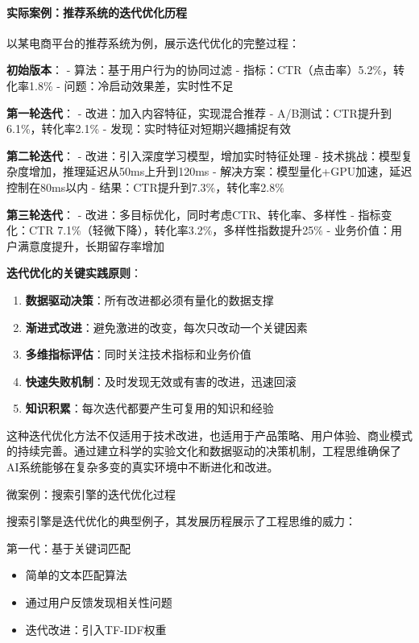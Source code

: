 \paragraph{实际案例：推荐系统的迭代优化历程}
以某电商平台的推荐系统为例，展示迭代优化的完整过程：

\textbf{初始版本}：
- 算法：基于用户行为的协同过滤
- 指标：CTR（点击率）5.2\%，转化率1.8\%
- 问题：冷启动效果差，实时性不足

\textbf{第一轮迭代}：
- 改进：加入内容特征，实现混合推荐
- A/B测试：CTR提升到6.1\%，转化率2.1\%
- 发现：实时特征对短期兴趣捕捉有效

\textbf{第二轮迭代}：
- 改进：引入深度学习模型，增加实时特征处理
- 技术挑战：模型复杂度增加，推理延迟从50ms上升到120ms
- 解决方案：模型量化+GPU加速，延迟控制在80ms以内
- 结果：CTR提升到7.3\%，转化率2.8\%

\textbf{第三轮迭代}：
- 改进：多目标优化，同时考虑CTR、转化率、多样性
- 指标变化：CTR 7.1\%（轻微下降），转化率3.2\%，多样性指数提升25\%
- 业务价值：用户满意度提升，长期留存率增加

\textbf{迭代优化的关键实践原则}：
\begin{enumerate}
\item \textbf{数据驱动决策}：所有改进都必须有量化的数据支撑
\item \textbf{渐进式改进}：避免激进的改变，每次只改动一个关键因素
\item \textbf{多维指标评估}：同时关注技术指标和业务价值
\item \textbf{快速失败机制}：及时发现无效或有害的改进，迅速回滚
\item \textbf{知识积累}：每次迭代都要产生可复用的知识和经验
\end{enumerate}

这种迭代优化方法不仅适用于技术改进，也适用于产品策略、用户体验、商业模式的持续完善。通过建立科学的实验文化和数据驱动的决策机制，工程思维确保了AI系统能够在复杂多变的真实环境中不断进化和改进。

微案例：搜索引擎的迭代优化过程

搜索引擎是迭代优化的典型例子，其发展历程展示了工程思维的威力：

第一代：基于关键词匹配
\begin{itemize}
\item 简单的文本匹配算法
\item 通过用户反馈发现相关性问题
\item 迭代改进：引入TF-IDF权重
\end{itemize}

